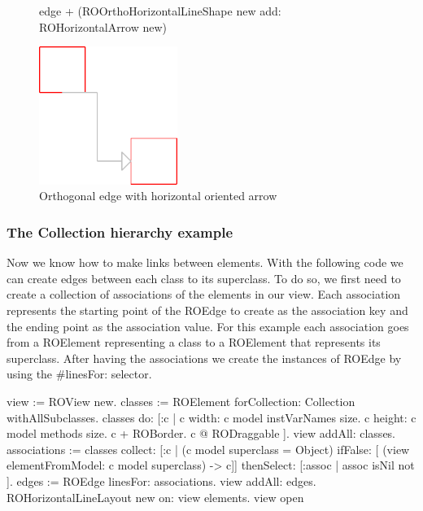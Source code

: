 \documentclass[a4paper,10pt,twoside]{book}
\begin{document}
\begin{figure}[H]
      \begin{minipage}[t]{0.5\textwidth}
      \vspace{0pt}
     \begin{code}{}
edge + (ROOrthoHorizontalLineShape new add: ROHorizontalArrow new)\end{code}
   \end{minipage}
   \hfill
   \begin{minipage}[t]{0.4\textwidth}
      \vspace{0pt} \raggedright
       \centering
		\includegraphics[width=0.4\textwidth]{orthoEdge}
   \end{minipage}
\caption{Orthogonal edge with horizontal oriented arrow}
\label{fig:orthoEdge}
\end{figure} 

\subsubsection*{The Collection hierarchy example}
Now we know how to make links between elements. With the following code we can create edges between each class to its superclass. To do so, we first need to create a collection of associations of the elements in our view. Each association represents the starting point of the ROEdge to create as the association key and the ending point as the association value. For this example each association goes from a ROElement representing a class to a ROElement that represents its superclass. After having the associations we create the instances of ROEdge by using the \#linesFor: selector.

\begin{code}{}
view := ROView new.
classes := ROElement forCollection: Collection withAllSubclasses.
classes do: [:c | 
	c width: c model instVarNames size.
	c height: c model methods size.
	c + ROBorder. 
	c @ RODraggable ].
view addAll: classes.
associations := classes 
					collect: [:c | 	(c model superclass = Object)
										ifFalse: [ (view elementFromModel: c model superclass) -> c]]
					thenSelect: [:assoc | assoc isNil not ].
edges := ROEdge linesFor: associations.
view addAll: edges.
ROHorizontalLineLayout new on: view elements.
view open
\end{code}
\end{document}
